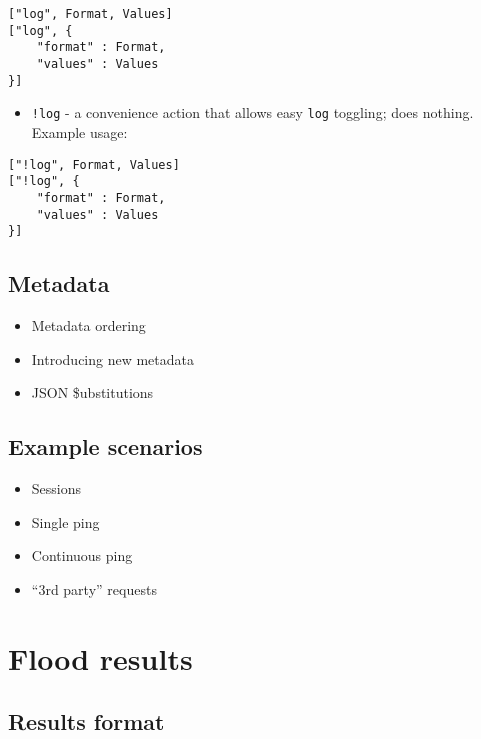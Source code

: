\documentclass[a4paper]{article}
\begin{document}
\begin{verbatim}
["log", Format, Values]
["log", {
    "format" : Format,
    "values" : Values
}]
\end{verbatim}





\begin{itemize}
\item \texttt{!log} - a convenience action that allows easy \texttt{log} toggling; does nothing. Example usage:
\end{itemize}

\begin{verbatim}
["!log", Format, Values]
["!log", {
    "format" : Format,
    "values" : Values
}]
\end{verbatim}
\subsection{Metadata}
\label{sec-3-6}
\label{ref-metadata}



\begin{itemize}
\item Metadata ordering
\item Introducing new metadata
\item JSON \$ubstitutions
\end{itemize}
\subsection{Example scenarios}
\label{sec-3-7}
\label{ref-example_scenarios}



\begin{itemize}
\item Sessions
\item Single ping
\item Continuous ping
\item ``3rd party'' requests
\end{itemize}

\pagebreak
\section{Flood results}
\label{sec-4}
\subsection{Results format}
\label{sec-4-1}
\end{document}
